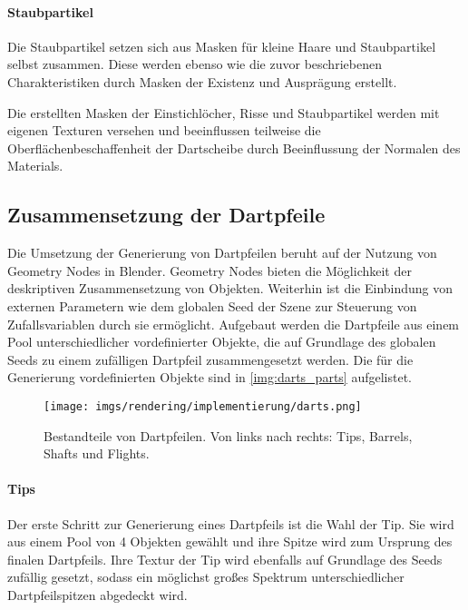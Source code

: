 \paragraph{Staubpartikel}

Die Staubpartikel setzen sich aus Masken für kleine Haare und Staubpartikel selbst zusammen. Diese werden ebenso wie die zuvor beschriebenen Charakteristiken durch Masken der Existenz und Ausprägung erstellt.

\vspace{\baselineskip}

Die erstellten Masken der Einstichlöcher, Risse und Staubpartikel werden mit eigenen Texturen versehen und beeinflussen teilweise die Oberflächenbeschaffenheit der Dartscheibe durch Beeinflussung der Normalen des Materials.

\subsection{Zusammensetzung der Dartpfeile}  %
\label{sec:dartpfeile_zusammensetzung}

Die Umsetzung der Generierung von Dartpfeilen beruht auf der Nutzung von Geometry Nodes in Blender. Geometry Nodes bieten die Möglichkeit der deskriptiven Zusammensetzung von Objekten. Weiterhin ist die Einbindung von externen Parametern wie dem globalen Seed der Szene zur Steuerung von Zufallsvariablen durch sie ermöglicht. Aufgebaut werden die Dartpfeile aus einem Pool unterschiedlicher vordefinierter Objekte, die auf Grundlage des globalen Seeds zu einem zufälligen Dartpfeil zusammengesetzt werden. Die für die Generierung vordefinierten Objekte sind in \autoref{img:darts_parts} aufgelistet.

\begin{figure}
    \centering
    \texttt{[image: imgs/rendering/implementierung/darts.png]}
    \caption{Bestandteile von Dartpfeilen. Von links nach rechts: Tips, Barrels, Shafts und Flights.}
    \label{img:darts_parts}
\end{figure}

\paragraph{Tips}

Der erste Schritt zur Generierung eines Dartpfeils ist die Wahl der Tip. Sie wird aus einem Pool von 4 Objekten gewählt und ihre Spitze wird zum Ursprung des finalen Dartpfeils. Ihre Textur der Tip wird ebenfalls auf Grundlage des Seeds zufällig gesetzt, sodass ein möglichst großes Spektrum unterschiedlicher Dartpfeilspitzen abgedeckt wird.

